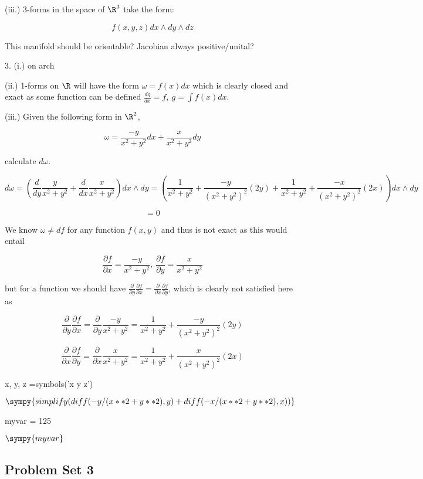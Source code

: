 \documentclass{article}\usepackage[]{graphicx}\usepackage[]{color}
\begin{document}
(iii.) 3-forms in the space of $\R^3$ take the form:

$$
f(x,y,z)dx\wedge dy\wedge dz
$$

This manifold should be orientable? Jacobian always positive/unital?

3. (i.) on arch

(ii.) 1-forms on $\R$ will have the form $\omega=f(x)dx$ which is clearly closed and exact as some function can be defined $\frac{dg}{dx}=f,\ g=\int f(x) dx$.

(iii.) Given the following form in $\R^2$, 

$$
\omega=\frac{-y}{x^2+y^2}dx + \frac{x}{x^2+y^2}dy
$$

calculate $d\omega$.

$$
d\omega=\left(\frac{d}{dy}\frac{y}{x^2+y^2}+\frac{d}{dx}\frac{x}{x^2+y^2}\right) dx\wedge dy=\left(\frac{1}{x^2+y^2}+\frac{-y}{(x^2+y^2)^2}(2y)+\frac{1}{x^2+y^2}+\frac{-x}{(x^2+y^2)^2}(2x)\right) dx\wedge dy
$$

$$
=0
$$

We know $\omega\neq df$ for any function $f(x,y)$ and thus is not exact as this would entail 

$$
\frac{\partial f}{\partial x}=\frac{-y}{x^2+y^2},\ \frac{\partial f}{\partial y}=\frac{x}{x^2+y^2}
$$

but for a function we should have $\frac{\partial }{\partial y}\frac{\partial f}{\partial x}=\frac{\partial }{\partial x}\frac{\partial f}{\partial y}$, which is clearly not satisfied here as

$$
\frac{\partial }{\partial y}\frac{\partial f}{\partial x}=\frac{\partial }{\partial y}\frac{-y}{x^2+y^2}=\frac{1}{x^2+y^2}+\frac{-y}{(x^2+y^2)^2}(2y)
$$

$$
\frac{\partial }{\partial x}\frac{\partial f}{\partial y}=\frac{\partial }{\partial x}\frac{x}{x^2+y^2}=\frac{1}{x^2+y^2}+\frac{x}{(x^2+y^2)^2}(2x)
$$

\begin{sympycode}
x, y, z =symbols('x y z')
\end{sympycode}

$\sympy{simplify(diff(-y/(x**2+y**2),y)+diff(-x/(x**2+y**2),x))}$


\begin{sympycode}
myvar = 125
\end{sympycode}

$\sympy{myvar}$

\subsection{Problem Set 3}
\end{document}
